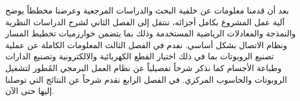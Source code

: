 بعد أن قدمنا معلومات عن خلفية البحث والدراسات المرجعية وعرضنا مخططاً يوضح آلية عمل المشروع بكامل أجزائه،  ننتقل إلى الفصل الثاني لشرح الدراسات النظرية والنمذجة والمعادلات الرياضية المستخدمة وذلك بما يتضمن خوارزميات تخطيط المسار ونظام الاتصال بشكل أساسي. نفدم في الفصل الثالث المعلومات الكاملة عن عملية تصنيع الروبوتات بما في ذلك اختيار القطع الكهربائية والالكترونية وتصنيع الدارات وطباعة الأجسام كما نذكر شرحاً تفصيلياً عن نظام العمل البرمجي المُطور لتشغيل الروبوتات والحاسوب المركزي. في الفصل الرابع نقدم شرحاً عن النتائج التي توصلنا إليها حتى الآن.